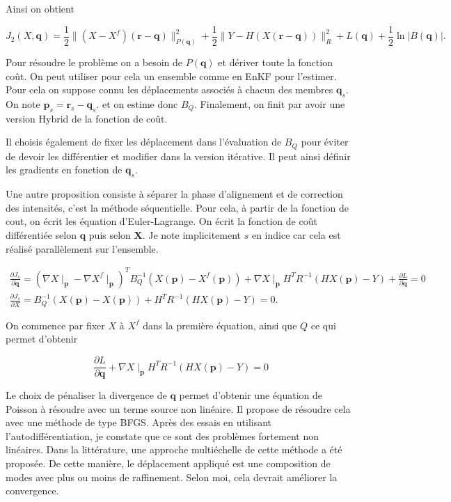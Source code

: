 \documentclass{article}
\newcommand{\norm}[1]{\|#1\|}
\newcommand{\bX}{\bm{X}}
\newcommand{\bq}{\bm{q}}
\newcommand{\bp}{\bm{p}}
\newcommand{\br}{\bm{r}}
\begin{document}
Ainsi on obtient

$$
    J_2(X, \bq) = \frac12 \norm{(X - X^f)(\br - \bq)}^2_{P(\bq)} + \frac12 \norm{Y - H(X(\br - \bq))}^2_{R} + L(\bq) + \frac12 \ln{|B(\bq)|}.
$$

Pour résoudre le problème on a besoin de $P(\bq)$ et dériver toute la fonction coût. On peut utiliser pour cela un ensemble comme en EnKF pour l'estimer.
Pour cela on suppose connu les déplacements associés  à chacun des membres $\bq_s$. On note $\bp_s = \br_s - \bq_s$. et on estime donc $B_Q$. Finalement, on finit par avoir une version Hybrid de la fonction de coût.

Il choisis également de fixer les déplacement dans l'évaluation de $B_Q$ pour éviter de devoir les différentier et modifier dans la version itérative. Il peut ainsi définir les gradients en fonction de $\bq_s$.

Une autre proposition consiste à séparer la phase d'alignement et de correction des intensités, c'est la méthode séquentielle. Pour cela, à partir de la fonction de cout, on écrit les équation d'Euler-Lagrange. On écrit la fonction de coût différentiée selon $\bq$ puis selon $\bX$. Je note implicitement $s$ en indice car cela est réalisé parallèlement sur l'ensemble.


\begin{eqnarray*}
    \frac{\partial J_s}{\partial \bq} = (\nabla X \mid_{\bp} - \nabla X^f \mid_{\bp})^T B_Q^{-1} (X(\bp) - X^f(\bp)) + \nabla X \mid_{\bp} H^T R^{-1} (H X(\bp) - Y) + \frac{\partial L}{\partial \bq} = 0 \\
    \frac{\partial J_s}{\partial X} =  B_Q^{-1}  (X(\bp) - X(\bp)) + H^T R^{-1} (H X(\bp) - Y) = 0.
\end{eqnarray*}

On commence par fixer $X$ à $X^f$ dans la première équation, ainsi que $Q$ ce qui permet d'obtenir

$$
    \frac{\partial L}{\partial \bq} + \nabla X \mid_{\bp} H^T R^{-1} (H X(\bp) - Y) = 0
$$

Le choix de pénaliser la divergence de $\mathbf{q}$ permet d'obtenir une équation de Poisson à résoudre avec un terme source non linéaire. Il propose de résoudre cela avec une méthode de type BFGS. Après des essais en utilisant l'autodifférentiation, je constate que ce sont des problèmes fortement non linéaires. Dans la littérature, une approche multiéchelle de cette méthode a été proposée. De cette manière, le déplacement appliqué est une composition de modes avec plus ou moins de raffinement. Selon moi, cela devrait améliorer la convergence.
\end{document}

